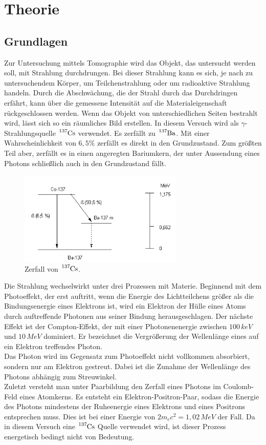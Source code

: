 \section{Theorie}
\subsection{Grundlagen}
Zur Untersuchung mittels Tomographie wird das Objekt, das untersucht werden soll, mit Strahlung durchdrungen.
Bei dieser Strahlung kann es sich, je nach zu untersuchendem Körper, um Teilchenstrahlung oder um radioaktive Strahlung handeln.
Durch die Abschwächung, die der Strahl durch das Durchdringen erfährt, kann über die gemessene Intensität auf die Materialeigenschaft rückgeschlossen werden.
Wenn das Objekt von unterschiedlichen Seiten bestrahlt wird, lässt sich so ein räumliches Bild erstellen.
In diesem Versuch wird als $\gamma$-Strahlungsquelle $\ce{^{137}Cs}$ verwendet. Es zerfällt zu $\ce{^{137}Ba}$.
Mit einer Wahrscheinlichkeit von $6,5 \%$ zerfällt es direkt in den Grundzustand.
Zum größten Teil aber, zerfällt es in einen angeregten Bariumkern, der unter Aussendung eines Photons schließlich auch in den Grundzustand fällt.

\begin{figure}[H]
  \centering
  \includegraphics[width=0.7\textwidth]{Bilder/caesium.png}
  \caption{Zerfall von $\ce{^{137}Cs}$.\cite{caesium}}
  \label{fig:caesium}
\end{figure}

Die Strahlung wechselwirkt unter drei Prozessen mit Materie.
Beginnend mit dem Photoeffekt, der erst auftritt, wenn die Energie des Lichtteilchens größer als die Bindungsenergie eines Elektrons ist, wird ein Elektron der Hülle eines
Atoms durch auftreffende Photonen aus seiner Bindung herausgeschlagen.
Der nächste Effekt ist der Compton-Effekt, der mit einer Photonenenergie zwischen $100\, \si{keV}$ und $10\, \si{MeV}$ dominiert.
Er bezeichnet die Vergrößerung der Wellenlänge eines auf ein Elektron treffendes Photon.\\
Das Photon wird im Gegensatz zum Photoeffekt nicht vollkommen absorbiert, sondern nur am Elektron gestreut. Dabei ist die Zunahme der Wellenlänge des Photons
abhängig zum Streuwinkel.\\
Zuletzt versteht man unter Paarbildung den Zerfall eines Photons im Coulomb-Feld eines Atomkerns.
Es entsteht ein Elektron-Positron-Paar, sodass die Energie des Photons mindestens der Ruheenergie eines Elektrons und eines Positrons entsprechen muss.
Dies ist bei einer Energie von $2m_ec^2 = 1,02\, \si{MeV}$ der Fall.
Da in diesem Versuch eine $\ce{^{137}Cs}$ Quelle verwendet wird, ist dieser Prozess energetisch bedingt nicht von Bedeutung.

